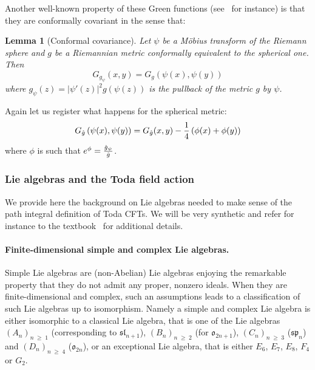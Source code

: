 \documentclass[10pt]{amsart}
\newtheorem{lemm}[theo]{Lemma}\newtheorem{prop}[theo]{Proposition}\newtheorem{coro}[theo]{Corollary}\newtheorem{conj}[theo]{Conjecture}
\theoremstyle{definition}\newtheorem{defi}[theo]{Definition}\newtheorem{rema}[theo]{Remark}\newtheorem{exam}[theo]{Example}\newtheorem{exem}[theo]{Example}\newtheorem{nota}[theo]{Notation}
\renewcommand{\geq}{\;\geqslant\;}
\newcommand{\frksl}{\mathfrak{sl}}
\newcommand{\frko}{\mathfrak{o}}
\newcommand{\frksp}{\mathfrak{sp}}
\newcommand{\norm}[1]{\left\lvert#1\right\rvert}
\let\oldhat\hat
\renewcommand*{\hat}[1]{\mathchoice{\widehat{#1}}{\widehat{#1}}{\oldhat{#1}}{\oldhat{#1}}}
\begin{document}
Another well-known property of these Green functions (see~\cite[Proposition~2.2]{DKRV} for instance) is that they are conformally covariant in the sense that:
\begin{lemm}[{Conformal covariance}]\label{conformal_covariance_green}
Let $\psi$ be a M\"obius transform of the Riemann sphere and $g$ be a Riemannian metric conformally equivalent to the spherical one. Then
\begin{equation}
G_{g_{\psi}}(x,y)=G_g\left(\psi(x),\psi(y)\right)
\end{equation}
where $g_{\psi}(z)=\norm{\psi'(z)}^2g(\psi(z))$ is the pullback of the metric $g$ by $\psi$.
\end{lemm}

Again let us register what happens for the spherical metric:
\begin{equation}\label{conformal_spherical}
G_{\hat g}\left(\psi(x),\psi(y)\right)=G_{\hat g}(x,y)-\frac14\left(\phi(x)+\phi(y)\right)
\end{equation}
where $\phi$ is such that $e^{\phi}=\frac{\hat g_{\psi}}{\hat g}$.


\subsubsection{Lie algebras and the Toda field action}\label{Lie_reminders}
We provide here the background on Lie algebras needed to make sense of the path integral definition of Toda CFTs. We will be very synthetic and refer for instance to the textbook~\cite{Hum72} for additional details.

\paragraph{Finite-dimensional simple and complex Lie algebras.} Simple Lie algebras are (non-Abelian) Lie algebras enjoying the remarkable property that they do not admit any proper, nonzero ideals. When they are finite-dimensional and complex, such an assumptions leads to a classification of such Lie algebras up to isomorphism. Namely a simple and complex Lie algebra is either isomorphic to a classical Lie algebra, that is one of the Lie algebras $(A_n)_{n\geq 1}$ (corresponding to $\frksl_{n+1}$), $(B_n)_{n\geq 2}$ (for $\frko_{2n+1}$), $(C_n)_{n\geq 3}$ ($\frksp_n$) and $(D_n)_{n\geq 4}$ ($\frko_{2n}$), or an exceptional Lie algebra, that is either $E_6$, $E_7$, $E_8$, $F_4$ or $G_2$.
\end{document}
